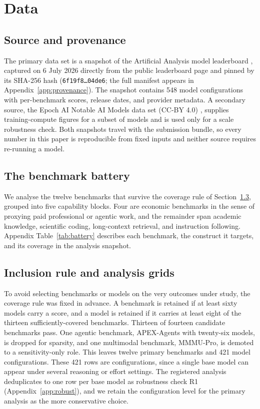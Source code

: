 \section{Data}\label{sec:data}

\subsection{Source and provenance}\label{sec:source}
The primary data set is a snapshot of the Artificial Analysis model leaderboard \cite{aa2026}, captured
on 6 July 2026 directly from the public leaderboard page and pinned by its SHA-256 hash
(\texttt{6f19f8\ldots04de6}; the full manifest appears in Appendix~\ref{app:provenance}). The snapshot
contains 548 model configurations with per-benchmark scores, release dates, and provider metadata. A
secondary source, the Epoch AI Notable AI Models data set (CC-BY 4.0) \cite{epoch2026}, supplies
training-compute figures for a subset of models and is used only for a scale robustness check. Both
snapshots travel with the submission bundle, so every number in this paper is reproducible from fixed
inputs and neither source requires re-running a model.

\subsection{The benchmark battery}\label{sec:battery}
We analyse the twelve benchmarks that survive the coverage rule of Section~\ref{sec:inclusion}, grouped
into five capability blocks. Four are economic benchmarks in the sense of proxying paid professional or
agentic work, and the remainder span academic knowledge, scientific coding, long-context retrieval, and
instruction following. Appendix Table~\ref{tab:battery} describes each benchmark, the construct it targets, and
its coverage in the analysis snapshot.

\subsection{Inclusion rule and analysis grids}\label{sec:inclusion}
To avoid selecting benchmarks or models on the very outcomes under study, the coverage rule was fixed in
advance. A benchmark is retained if at least sixty models carry a score, and a model is retained if it
carries at least eight of the thirteen sufficiently-covered benchmarks. Thirteen of fourteen candidate
benchmarks pass. One agentic benchmark, APEX-Agents with twenty-six models, is dropped for sparsity, and
one multimodal benchmark, MMMU-Pro, is demoted to a sensitivity-only role. This leaves twelve primary
benchmarks and 421 model configurations. These 421 rows are configurations, since a single base
model can appear under several reasoning or effort settings. The registered analysis
deduplicates to one row per base model as robustness check R1 (Appendix~\ref{app:robust}), and we retain
the configuration level for the primary analysis as the more conservative choice.

